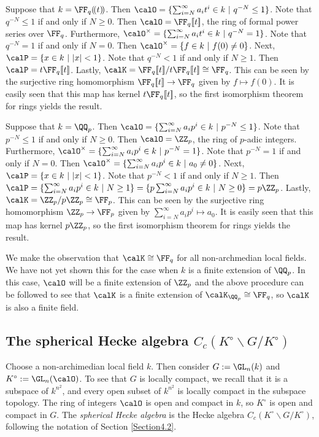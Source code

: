 \documentclass[11pt]{amsart}
\theoremstyle{remark}
\begin{document}
Suppose that $k=\FF_q(\!(t)\!)$.
Then $\calO=\{\sum_{i=N}^\infty a_it^i \in k\ |\ q^{-N}\leq 1\}$.
Note that $q^{-N}\leq 1$ if and only if $N\geq 0$.
Then $\calO = \FF_q[\![t]\!]$, the ring of formal power series over $\FF_q$.
Furthermore, $\calO^\times = \{\sum_{i=N}^\infty a_it^i\in k\ |\ q^{-N}=1\}$.
Note that $q^{-N}=1$ if and only if $N=0$.
Then $\calO^\times = \{f\in k\ |\ f(0)\neq 0\}$.
Next, $\calP = \{x\in k\ |\ |x|<1\}$.
Note that $q^{-N}<1$ if and only if $N\geq 1$.
Then $\calP = t\FF_q[\![t]\!]$.
Lastly, $\calK = \FF_q[\![t]\!]/t\FF_q[\![t]\!] \cong \FF_q$.
This can be seen by the surjective ring homomorphism $\FF_q[\![t]\!]\to\FF_q$ given by $f\mapsto f(0)$.
It is easily seen that this map has kernel $t\FF_q[\![t]\!]$, so the first isomorphism theorem for rings yields the result.

Suppose that $k=\QQ_p$.
Then $\calO=\{\sum_{i=N}^\infty a_ip^i \in k\ |\ p^{-N}\leq 1\}$.
Note that $p^{-N}\leq 1$ if and only if $N\geq 0$.
Then $\calO = \ZZ_p$, the ring of $p$-adic integers.
Furthermore, $\calO^\times = \{\sum_{i=N}^\infty a_ip^i\in k\ |\ p^{-N}=1\}$.
Note that $p^{-N}=1$ if and only if $N=0$.
Then $\calO^\times = \{\sum_{i=N}^\infty a_ip^i\in k\ |\ a_0\neq 0\}$.
Next, $\calP = \{x\in k\ |\ |x|<1\}$.
Note that $p^{-N}<1$ if and only if $N\geq 1$.
Then $\calP = \{\sum_{i=N}^\infty a_ip^i\in k\ |\ N\geq 1\}=\{p\sum_{i=N}^\infty a_ip^i\in k\ |\ N\geq 0\} = p\ZZ_p$.
Lastly, $\calK = \ZZ_p/p\ZZ_p \cong \FF_p$.
This can be seen by the surjective ring homomorphism $\ZZ_p\to \FF_p$ given by $\sum_{i=N}^\infty a_ip^i \mapsto a_0$.
It is easily seen that this map has kernel $p\ZZ_p$, so the first isomorphism theorem for rings yields the result.

We make the observation that $\calK\cong\FF_q$ for all non-archmedian local fields.
We have not yet shown this for the case when $k$ is a finite extension of $\QQ_p$.
In this case, $\calO$ will be a finite extension of $\ZZ_p$ and the above procedure can be followed to see that $\calK$ is a finite extension of $\calK_{\QQ_p}\cong\FF_q$, so $\calK$ is also a finite field.


\subsection{The spherical Hecke algebra $C_c(K^\circ\backslash G/K^\circ)$}\label{Section5.3}
Choose a non-archimedian local field $k$.
Then consider $G:=\GL_n(k)$ and $K^\circ := \GL_n(\calO)$.
To see that $G$ is locally compact, we recall that it is a subspace of $k^{n^2}$, and every open subset of $k^{n^2}$ is locally compact in the subspace topology.
The ring of integers $\calO$ is open and compact in $k$, so $K^\circ$ is open and compact in $G$.
The \emph{spherical Hecke algebra} is the Hecke algebra $C_c(K^\circ\backslash G/K^\circ)$, following the notation of Section \ref{Section4.2}.
\end{document}
